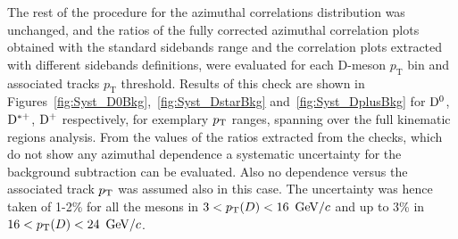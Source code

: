 The rest of the procedure for the azimuthal correlations distribution was unchanged, and the ratios of the fully corrected azimuthal correlation plots obtained with the standard sidebands range and the correlation plots extracted with different sidebands definitions, were evaluated for each D-meson $p_\text{T}$ bin and associated tracks $p_\text{T}$ threshold. Results of this check are shown in Figures~\ref{fig:Syst_D0Bkg},~\ref{fig:Syst_DstarBkg} and~\ref{fig:Syst_DplusBkg} for ${\rm D^0}$, ${\rm D^{*+}}$, ${\rm D^+}$ respectively, for exemplary $p_{\rm T}$ ranges, spanning over the full kinematic regions analysis. From the values of the ratios extracted from the checks, which do not show any azimuthal dependence a systematic uncertainty for the background subtraction can be evaluated. Also no dependence versus the associated track $p_{\rm T}$ was assumed also in this case. The uncertainty was hence taken of 1-2\% for all the mesons in $3 < p_{\rm T}(D) < 16$ $\mathrm{GeV}/c$ and up to 3\% in $16 < p_{\rm T}(D) < 24$ $\mathrm{GeV}/c$.


